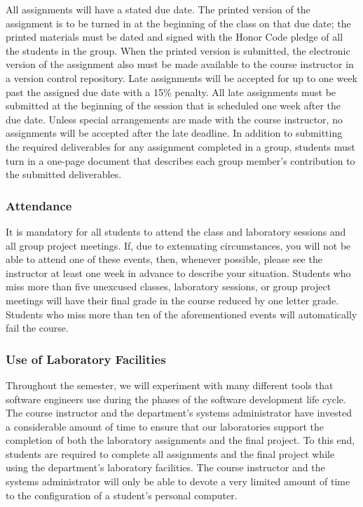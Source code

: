 All assignments will have a stated due date. The printed version of the assignment is to be turned in at the beginning
of the class on that due date; the printed materials must be dated and signed with the Honor Code pledge of all the
students in the group.  When the printed version is submitted, the electronic version of the assignment also must be
made available to the course instructor in a version control repository. Late assignments will be accepted for up to one
week past the assigned due date with a 15\% penalty. All late assignments must be submitted at the beginning of the
session that is scheduled one week after the due date. Unless special arrangements are made with the course instructor,
no assignments will be accepted after the late deadline. In addition to submitting the required deliverables for any
assignment completed in a group, students must turn in a one-page document that describes each group member's
contribution to the submitted deliverables.

\subsubsection*{Attendance}

It is mandatory for all students to attend the class and laboratory sessions and all group project meetings. If, due to
extenuating circumstances, you will not be able to attend one of these events, then, whenever possible, please see the
instructor at least one week in advance to describe your situation. Students who miss more than five unexcused classes,
laboratory sessions, or group project meetings will have their final grade in the course reduced by one letter grade.
Students who miss more than ten of the aforementioned events will automatically fail the course.

\subsubsection*{Use of Laboratory Facilities}

Throughout the semester, we will experiment with many different tools that software engineers use during the phases of
the software development life cycle.  The course instructor and the department's systems administrator have invested a
considerable amount of time to ensure that our laboratories support the completion of both the laboratory assignments and the
final project.  To this end, students are required to complete all assignments and the final project while using the
department's laboratory facilities. The course instructor and the systems administrator will only be able to devote a
very limited amount of time to the configuration of a student's personal computer.

